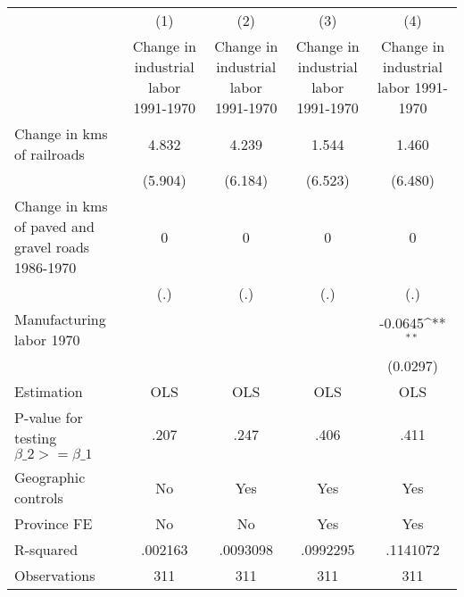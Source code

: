 {
\def\sym#1{\ifmmode^{#1}\else\(^{#1}\)\fi}
\begin{tabular}{l*{4}{c}}
\hline\hline
                &\multicolumn{1}{c}{(1)}&\multicolumn{1}{c}{(2)}&\multicolumn{1}{c}{(3)}&\multicolumn{1}{c}{(4)}\\
                &\multicolumn{1}{c}{Change in industrial labor 1991-1970}&\multicolumn{1}{c}{Change in industrial labor 1991-1970}&\multicolumn{1}{c}{Change in industrial labor 1991-1970}&\multicolumn{1}{c}{Change in industrial labor 1991-1970}\\
\hline
Change in kms of railroads&    4.832         &    4.239         &    1.544         &    1.460         \\
                &  (5.904)         &  (6.184)         &  (6.523)         &  (6.480)         \\
[1em]
Change in kms of paved and gravel roads 1986-1970&        0         &        0         &        0         &        0         \\
                &      (.)         &      (.)         &      (.)         &      (.)         \\
[1em]
Manufacturing labor 1970&                  &                  &                  &  -0.0645\sym{**} \\
                &                  &                  &                  & (0.0297)         \\
\hline
Estimation      &      OLS         &      OLS         &      OLS         &      OLS         \\
P-value for testing $\beta\_2 >= \beta\_1$&     .207         &     .247         &     .406         &     .411         \\
Geographic controls&       No         &      Yes         &      Yes         &      Yes         \\
Province FE     &       No         &       No         &      Yes         &      Yes         \\
R-squared       &  .002163         & .0093098         & .0992295         & .1141072         \\
Observations    &      311         &      311         &      311         &      311         \\
\hline\hline
\end{tabular}
}
